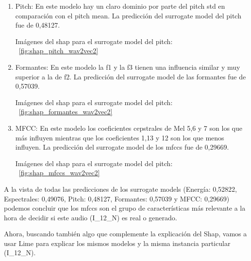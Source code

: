 \begin{enumerate}
 Imágenes del shap para el surrogate model de los espectrales: ~\ref{fig:shap_espectrales_wav2vec2}
 
 \item Pitch: En este modelo hay un claro dominio por parte del pitch std en comparación con el pitch mean. La predicción del surrogate model del pitch fue de 0,48127.
 
 Imágenes del shap para el surrogate model del pitch: ~\ref{fig:shap_pitch_wav2vec2}
 
 \item Formantes: En este modelo la f1 y la f3 tienen una influencia similar y muy superior a la de f2. La predicción del surrogate model de las formantes fue de 0,57039.
 
  Imágenes del shap para el surrogate model del pitch: ~\ref{fig:shap_formantes_wav2vec2}
 
 \item MFCC: En este modelo los coeficientes cepstrales de Mel 5,6 y 7 son los que más influyen mientras que los coeficientes 1,13 y 12 son los que menos influyen. La predicción del surrogate model de los mfccs fue de 0,29669.
 
 Imágenes del shap para el surrogate model del pitch: ~\ref{fig:shap_mfccs_wav2vec2} 
 
\end{enumerate}

A la vista de todas las predicciones de los surrogate models (Energía: 0,52822, Espectrales: 0,49076, Pitch: 0,48127, Formantes: 0,57039 y MFCC: 0,29669) podemos concluir que los mfccs son el grupo de características más relevante a la hora de decidir si este audio (I\_12\_N) es real o generado.

Ahora, buscando también algo que complemente la explicación del Shap, vamos a usar Lime para explicar los mismos modelos y la misma instancia particular (I\_12\_N).


